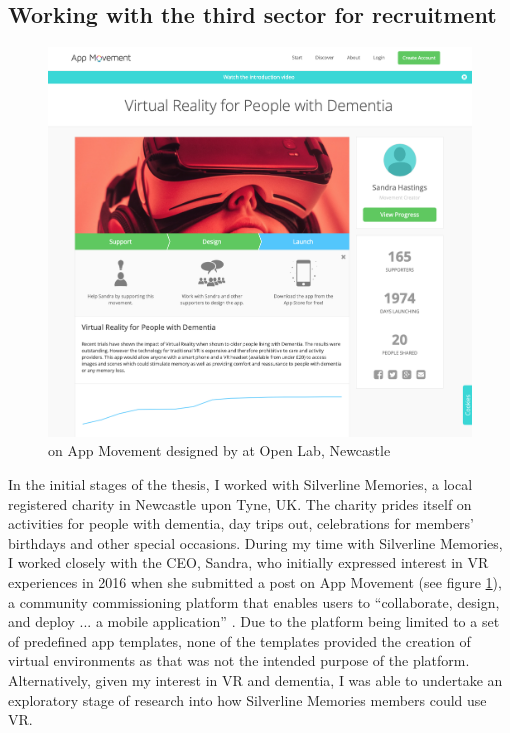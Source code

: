 \subsection{Working with the third sector for recruitment}
\label{Method:ThirdSector}
\begin{figure}[htp]
    \centering
    \includegraphics[width=0.6\linewidth]{Images/Methodology/AppMovement-SilverlineMemories.png}
    \caption{ on App Movement designed by  \cite{garbett_app_2016} at Open Lab, Newcastle}
    \label{fig:AppMovement-Sandra}
\end{figure}

In the initial stages of the thesis, I worked with Silverline Memories, a local registered charity in Newcastle upon Tyne, UK. The charity prides itself on activities for people with dementia, day trips out, celebrations for members' birthdays and other special occasions. During my time with Silverline Memories, I worked closely with the CEO, Sandra, who initially expressed interest in VR experiences in 2016 when she submitted a post on App Movement (see figure \ref{fig:AppMovement-Sandra}), a community commissioning platform that enables users to ``collaborate, design, and deploy ... a mobile application'' \citep{garbett_app_2016}. Due to the platform being limited to a set of predefined app templates, none of the templates provided the creation of virtual environments as that was not the intended purpose of the platform. Alternatively, given my interest in VR and dementia, I was able to undertake an exploratory stage of research into how Silverline Memories members could use VR. 

